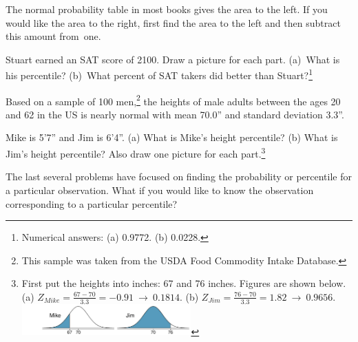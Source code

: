 \begin{tipBox}{
The normal probability table in most books gives the area to the left. If you would like the area to the right, first find the area to the left and then subtract this amount from~one.}
\end{tipBox}

\begin{exercise}
Stuart earned an SAT score of 2100. Draw a picture for each part. (a)~What is his percentile? (b)~What percent of SAT takers did better than Stuart?\footnote{Numerical answers: (a) 0.9772. (b) 0.0228.}
\end{exercise}

Based on a sample of 100 men,\footnote{This sample was taken from the USDA Food Commodity Intake Database.} the heights of male adults between the ages 20 and 62 in the US is nearly normal with mean 70.0'' and standard deviation 3.3''.

\begin{exercise}
Mike is 5'7'' and Jim is 6'4''. (a) What is Mike's height percentile? (b) What is Jim's height percentile? Also draw one picture for each part.\footnote{First put the heights into inches: 67 and 76 inches. Figures are shown below. (a) $Z_{Mike} = \frac{67 - 70}{3.3} = -0.91\ \to\ 0.1814$. (b) $Z_{Jim} = \frac{76 - 70}{3.3} = 1.82\ \to\ 0.9656$. \\\includegraphics[height=12mm]{03/figures/mikeAndJimPercentiles/mikeAndJimPercentiles}}
\end{exercise}

The last several problems have focused on finding the probability or percentile for a particular observation. What if you would like to know the observation corresponding to a particular percentile?

